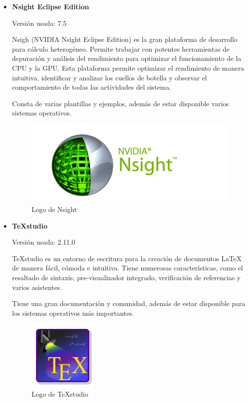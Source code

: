 \begin{itemize}
	\item \textbf{Nsight Eclipse Edition}
	
	Versión usada: 7.5
		
	Nsigh (NVIDIA Nsight Eclipse Edition) \cite{nsight} es la gran plataforma de desarrollo para cálculo heterogéneo. Permite trabajar con potentes herramientas de depuración y análisis del rendimiento para optimizar el funcionamiento de la CPU y la GPU. Esta plataforma permite optimizar el rendimiento de manera intuitiva, identificar y analizar los cuellos de botella y observar el comportamiento de todas las actividades del sistema.

	Consta de varias plantillas y ejemplos, además de estar disponible varios sistemas operativos.
 
	\bigskip
	\begin{figure}[h]
		\centering
		\includegraphics[width=0.4\linewidth]{../images/nsightlogo}
		\caption[Logo de Nsight]{Logo de Nsight}
		\label{fig:nsightlogo}
	\end{figure}
	
	\item \textbf{TeXstudio}
		
		Versión usada: 2.11.0
		
	TeXstudio \cite{texstudio} es un entorno de escritura para la creación de documentos LaTeX de manera fácil, cómoda e intuitiva. Tiene numerosas características, como el resaltado de sintaxis, pre-visualizador integrado, verificación de referencias y varios asistentes. 

	Tiene una gran documentación y comunidad, además de estar disponible para los sistemas operativos más importantes.
		
	\bigskip
	\begin{figure}[h]
		\centering
		\includegraphics[width=0.3\linewidth]{../images/texstudiologo}
		\caption[Logo de TeXstudio]{Logo de TeXstudio}
		\label{fig:texstudiologo}
	\end{figure}
			

\end{itemize}

